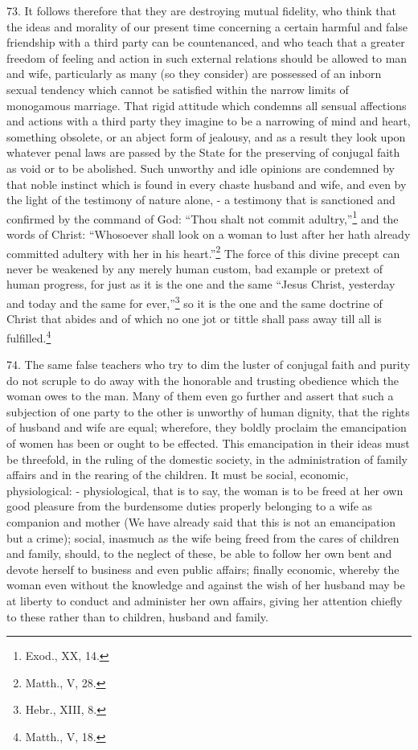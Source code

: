 \documentclass[12pt,a4paper]{book}
\begin{document}
73. It follows therefore that they are destroying mutual fidelity, who think that the ideas and morality of our present time concerning a certain harmful and false friendship with a third party can be countenanced, and who teach that a greater freedom of feeling and action in such external relations should be allowed to man and wife, particularly as many (so they consider) are possessed of an inborn sexual tendency which cannot be satisfied within the narrow limits of monogamous marriage. That rigid attitude which condemns all sensual affections and actions with a third party they imagine to be a narrowing of mind and heart, something obsolete, or an abject form of jealousy, and as a result they look upon whatever penal laws are passed by the State for the preserving of conjugal faith as void or to be abolished. Such unworthy and idle opinions are condemned by that noble instinct which is found in every chaste husband and wife, and even by the light of the testimony of nature alone, - a testimony that is sanctioned and confirmed by the command of God: ``Thou shalt not commit adultry,''\footnote{Exod., XX, 14.} and the words of Christ: ``Whosoever shall look on a woman to lust after her hath already committed adultery with her in his heart.''\footnote{Matth., V, 28.} The force of this divine precept can never be weakened by any merely human custom, bad example or pretext of human progress, for just as it is the one and the same ``Jesus Christ, yesterday and today and the same for ever,''\footnote{Hebr., XIII, 8.} so it is the one and the same doctrine of Christ that abides and of which no one jot or tittle shall pass away till all is fulfilled.\footnote{Matth., V, 18.}

74. The same false teachers who try to dim the luster of conjugal faith and purity do not scruple to do away with the honorable and trusting obedience which the woman owes to the man. Many of them even go further and assert that such a subjection of one party to the other is unworthy of human dignity, that the rights of husband and wife are equal; wherefore, they boldly proclaim the emancipation of women has been or ought to be effected. This emancipation in their ideas must be threefold, in the ruling of the domestic society, in the administration of family affairs and in the rearing of the children. It must be social, economic, physiological: - physiological, that is to say, the woman is to be freed at her own good pleasure from the burdensome duties properly belonging to a wife as companion and mother (We have already said that this is not an emancipation but a crime); social, inasmuch as the wife being freed from the cares of children and family, should, to the neglect of these, be able to follow her own bent and devote herself to business and even public affairs; finally economic, whereby the woman even without the knowledge and against the wish of her husband may be at liberty to conduct and administer her own affairs, giving her attention chiefly to these rather than to children, husband and family.
\end{document}
